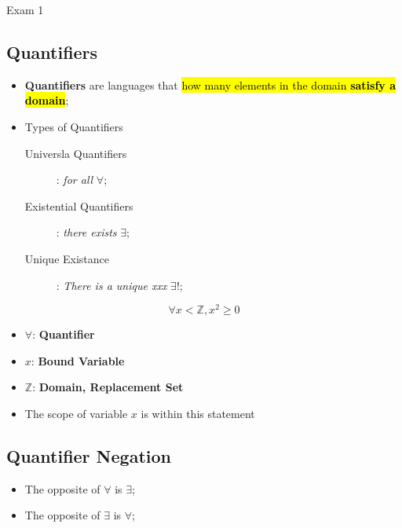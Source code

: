 \documentclass{note}
\begin{document}
\begin{note}{Exam 1}
        \subsection{Quantifiers}

        \begin{itemize}
            \item \textbf{Quantifiers} are languages that \hl{how many elements in the domain \textbf{satisfy a domain}};
            \item Types of Quantifiers
            \begin{description}
                \item[Universla Quantifiers]: \textit{for all} $ \forall $;
                \item[Existential Quantifiers]: \textit{there exists} $ \exists $;
                \item[Unique Existance]: \textit{There is a unique xxx} $ \exists ! $;
            \end{description}
        \end{itemize}

        \begin{displaymath}
            \forall x < \mathbb{Z}, x^{2} \geq 0
        \end{displaymath}

        \begin{itemize}
            \item $ \forall $: \textbf{Quantifier}
            \item $ x $: \textbf{Bound Variable}
            \item $ \mathbb{Z} $: \textbf{Domain, Replacement Set}
            \item The scope of variable $ x $ is within this statement
        \end{itemize}

        \subsection{Quantifier Negation}

        \begin{itemize}
            \item The opposite of $ \forall $ is $ \exists $;
            \item The opposite of $ \exists $ is $ \forall $;
        \end{itemize}


\end{note}
\end{document}
